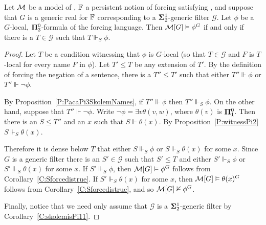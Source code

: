 \begin{prop}\label{P:presACAkey}
Let $\mathcal{M}$ be a model of \ACAo, $\mathbb{F}$ a persistent notion of forcing satisfying \MCP,
and suppose that $G$ is a generic real for $\mathbb{F}$
corresponding to a $\mathbf{\Sigma}^1_2$-generic filter $\mathcal{G}$.
Let $\phi$ be a $G$-local, $\mathbf{\Pi}^0_3$-formula of the forcing language.
Then $\mathcal{M}[G]\vDash\phi^G$ if and only if there is a $T\in\mathcal{G}$
such that $T\Vdash_S\phi$.
\end{prop}
\begin{proof}
Let $T$ be a condition witnessing that $\phi$ is $G$-local
(so that $T\in\mathcal{G}$ and $F$ is $T$-local for every name $F$ in $\phi$).
Let $T'\leq T$ be any extension of $T'$.
By the definition of forcing the negation of a sentence,
there is a $T''\leq T'$ such that either $T''\Vdash\phi$ or $T''\Vdash\neg\phi$.

By Proposition~\ref{P:PacaPi3SkolemNames}, if $T''\Vdash\phi$ then $T''\Vdash_S\phi$.
On the other hand, suppose that $T''\Vdash\neg\phi$.
Write $\neg\phi=\exists v \theta(v,w)$, where $\theta(v)$ is $\mathbf{\Pi}^0_1$.
Then there is an $S\leq T''$ and an $x$ such that $S\Vdash\theta(x)$.
By Proposition~\ref{P:witnessPi2} $S\Vdash_S\theta(x)$.

Therefore it is dense below $T$ that either
$S\Vdash_S\phi$ or $S\Vdash_S\theta(x)$ for some $x$.
Since $G$ is a generic filter there is an $S'\in\mathcal{G}$ such that
$S'\leq T$ and either $S'\Vdash_S\phi$ or $S'\Vdash_S\theta(x)$ for some $x$.
If $S'\Vdash_S\phi$, then $\mathcal{M}[G]\vDash\phi^G$ follows from Corollary~\ref{C:Sforcedistrue}.
If $S'\Vdash_S\theta(x)$ for some $x$,
then $\mathcal{M}[G]\vDash\theta(x)^G$ follows from Corollary~\ref{C:Sforcedistrue},
and so $\mathcal{M}[G]\nvDash\phi^G$.

Finally, notice that we need only assume that
$\mathcal{G}$ is a $\mathbf{\Sigma}^1_2$-generic filter by Corollary~\ref{C:skolemisPi11}.
\end{proof}

